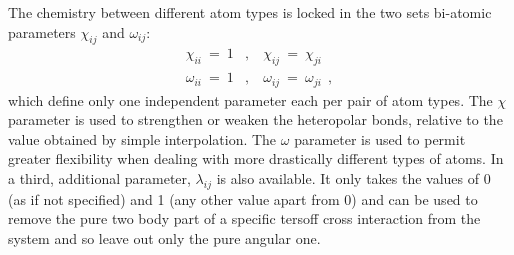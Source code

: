 The chemistry between different atom types is locked in the two
sets bi-atomic parameters $\chi_{ij}$ and $\omega_{ij}$:
\begin{eqnarray}
\chi_{ii}~=~1&,&~\chi_{ij}~=~\chi_{ji} \nonumber \\
\omega_{ii}~=~1&,&~\omega_{ij}~=~\omega_{ji}~~,
\end{eqnarray}
which define only one independent parameter each per pair of atom
types.  The $\chi$ parameter is used to strengthen or weaken the
heteropolar bonds, relative to the value obtained by simple
interpolation.  The $\omega$ parameter is used to permit greater
flexibility when dealing with more drastically different types of
atoms.  In \D a third, additional parameter, $\lambda_{ij}$ is
also available.  It only takes the values of 0 (as if not specified)
and 1 (any other value apart from 0) and can be used to remove the
pure two body part of a specific tersoff cross interaction from
the system and so leave out only the pure angular one.


